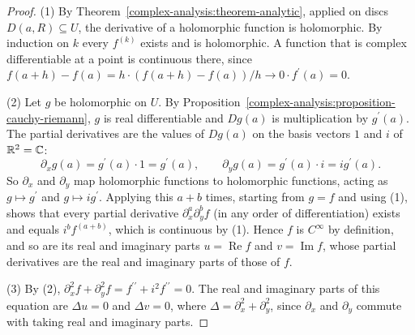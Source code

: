 \begin{proof}
(1) By Theorem~\ref{complex-analysis:theorem-analytic}, applied on discs $D(a, R) \subseteq U$, the derivative of a holomorphic function is holomorphic. By induction on $k$ every $f^{(k)}$ exists and is
holomorphic. A function that is complex differentiable at a point is continuous there, since $f(a + h) - f(a) = h \cdot (f(a + h) - f(a))/h \to 0 \cdot f^{\prime}(a) = 0$.

(2) Let $g$ be holomorphic on $U$. By Proposition~\ref{complex-analysis:proposition-cauchy-riemann}, $g$ is real differentiable and $Dg(a)$ is multiplication by $g^{\prime}(a)$. The partial derivatives are
the values of $Dg(a)$ on the basis vectors $1$ and $i$ of $\mathbb{R}^2 = \mathbb{C}$:
\[
\partial_xg(a) = g^{\prime}(a) \cdot 1 = g^{\prime}(a), \qquad \partial_yg(a) = g^{\prime}(a) \cdot i = ig^{\prime}(a).
\]
So $\partial_x$ and $\partial_y$ map holomorphic functions to holomorphic functions, acting as $g \mapsto g^{\prime}$ and $g \mapsto ig^{\prime}$. Applying this $a + b$ times, starting from $g = f$ and using
(1), shows that every partial derivative $\partial_x^a\partial_y^bf$ (in any order of differentiation) exists and equals $i^bf^{(a + b)}$, which is continuous by (1). Hence $f$ is $C^\infty$ by
definition, and so are its real and imaginary parts $u = \operatorname{Re}f$ and $v = \operatorname{Im}f$, whose partial derivatives are the real and imaginary parts of those of $f$.

(3) By (2), $\partial_x^2f + \partial_y^2f = f^{\prime\prime} + i^2f^{\prime\prime} = 0$. The real and imaginary parts of this equation are $\Delta u = 0$ and $\Delta v = 0$, where
$\Delta = \partial_x^2 + \partial_y^2$, since $\partial_x$ and $\partial_y$ commute with taking real and imaginary parts.
\end{proof}

